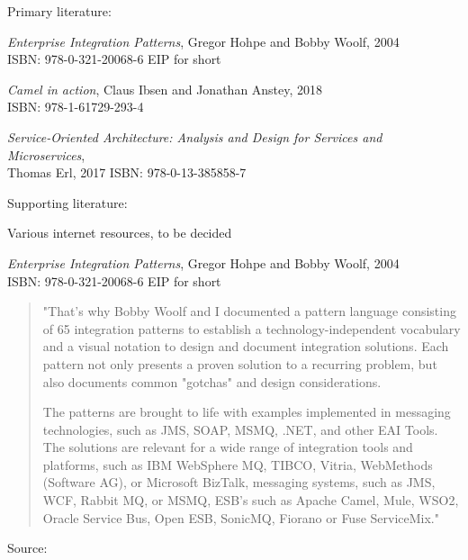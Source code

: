 \documentclass[Screen16to9,17pt]{foils}
\begin{document}
Primary literature:
\begin{list2}
\item \emph{Enterprise Integration Patterns}, Gregor Hohpe and Bobby Woolf, 2004\\
ISBN: 978-0-321-20068-6 EIP for short
\item \emph{Camel in action}, Claus Ibsen and Jonathan Anstey, 2018\\
ISBN: 978-1-61729-293-4
\item \emph{Service‑Oriented Architecture: Analysis and Design for Services and Microservices},\\ Thomas Erl, 2017
ISBN: 978-0-13-385858-7
\end{list2}
Supporting literature:
\begin{list2}
\item Various internet resources, to be decided
\end{list2}





\emph{Enterprise Integration Patterns}, Gregor Hohpe and Bobby Woolf, 2004\\
ISBN: 978-0-321-20068-6 EIP for short



\begin{quote}
"That's why Bobby Woolf and I documented a pattern language consisting of 65 integration patterns to establish a technology-independent vocabulary and a visual notation to design and document integration solutions. Each pattern not only presents a proven solution to a recurring problem, but also documents common "gotchas" and design considerations.

The patterns are brought to life with examples implemented in messaging technologies, such as JMS, SOAP, MSMQ, .NET, and other EAI Tools. The solutions are relevant for a wide range of integration tools and platforms, such as IBM WebSphere MQ, TIBCO, Vitria, WebMethods (Software AG), or Microsoft BizTalk, messaging systems, such as JMS, WCF, Rabbit MQ, or MSMQ, ESB's such as Apache Camel, Mule, WSO2, Oracle Service Bus, Open ESB, SonicMQ, Fiorano or Fuse ServiceMix."
\end{quote}

Source:\\
\end{document}
